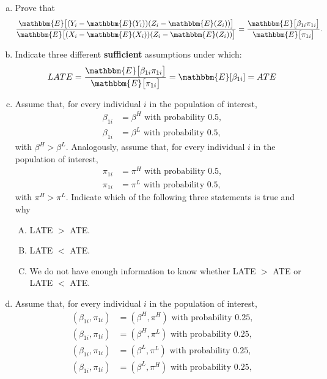 \documentclass[11pt,letterpaper]{article}
\begin{document}
\begin{enumerate}[(a)]
	\item  Prove that
	\begin{align*}
	\frac{\mathbbm{E}\big[(Y_{i}-\mathbbm{E}(Y_{i}))(Z_{i}-\mathbbm{E}(Z_{i}))\big]}{\mathbbm{E}\big[(X_{i}-\mathbbm{E}(X_{i}))(Z_{i}-\mathbbm{E}(Z_{i}))\big]}=\frac{\mathbbm{E}\big[\beta_{1i}\pi_{1i}\big]}{\mathbbm{E}\big[\pi_{1i}\big]}.
	\end{align*}
	\item  Indicate three different \textbf{sufficient} assumptions under which:
	\begin{align*}
	LATE=\frac{\mathbbm{E}\big[\beta_{1i}\pi_{1i}\big]}{\mathbbm{E}\big[\pi_{1i}\big]}=\mathbbm{E}[\beta_{1i}]=ATE
	\end{align*}
	\item  Assume that, for every individual $i$ in the population of interest,
	\begin{align*}
	\beta_{1i}&=\beta^{H}\text{ with probability 0.5,}\\
	\beta_{1i}&=\beta^{L}\text{ with probability 0.5,}
	\end{align*}
	with $\beta^{H}>\beta^{L}$. Analogously, assume that, for every individual $i$ in the population of interest,
	\begin{align*}
	\pi_{1i}&=\pi^{H}\text{ with probability 0.5,}\\
	\pi_{1i}&=\pi^{L}\text{ with probability 0.5,}
	\end{align*}
	with $\pi^{H}>\pi^{L}$. Indicate which of the following three statements is true and why
	\begin{enumerate}[A.]
		\item LATE $>$ ATE.
		\item LATE $<$ ATE.
		\item We do not have enough information to know whether LATE $>$ ATE or LATE $<$ ATE.
	\end{enumerate}
	\item Assume that, for every individual $i$ in the population of interest,
	\begin{align*}
	(\beta_{1i},\pi_{1i})&=(\beta^{H},\pi^{H})\text{ with probability 0.25,}\\
	(\beta_{1i},\pi_{1i})&=(\beta^{H},\pi^{L})\text{ with probability 0.25,}\\
	(\beta_{1i},\pi_{1i})&=(\beta^{L},\pi^{L})\text{ with probability 0.25,}\\
	(\beta_{1i},\pi_{1i})&=(\beta^{L},\pi^{H})\text{ with probability 0.25,}
	\end{align*}

\end{enumerate}
\end{document}
